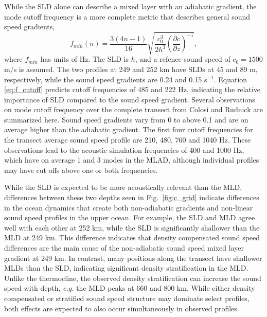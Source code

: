 \documentclass[preprint,NumberedRefs]{JASA}
\begin{document}
While the SLD alone can describe a mixed layer with an adiabatic gradient, the mode cutoff frequency\citep{Urick1982Prop} is a more complete metric that describes general sound speed gradients,
\begin{equation}
    f_{min}(n) = \frac{3(4n-1)}{16} \sqrt{\frac{c_0^3}{2h^3} \left( \frac{\partial c}{\partial z} \right) ^ {-1}},
    \label{eq:f_cutoff}
\end{equation}
where $f_{min}$ has units of Hz. The SLD is $h$, and a refence sound speed of $c_0 = 1500$ m/s is assumed. The two profiles at 249 and 252 km have SLDs at 45 and 89 m, respectively, while the sound speed gradients are 0.24 and 0.15 s$^{-1}$. Equation \eqref{eq:f_cutoff} predicts cutoff frequencies of 485 and 222 Hz, indicating the relative importance of SLD compared to the sound speed gradient. Several observations on mode cutoff frequency over the complete transect from Colosi and Rudnick\cite{colosi2020observations} are summarized here. Sound speed gradients vary from 0 to above 0.1 and are on average higher than the adiabatic gradient. The first four cutoff frequencies for the transect average sound speed profile are 210, 480, 760 and 1040 Hz. These observations lead to the acoustic simulation frequencies of 400 and 1000 Hz, which have on average 1 and 3 modes in the MLAD, although individual profiles may have cut offs above one or both frequencies.

While the SLD is expected to be more acoustically relevant than the MLD, differences between these two depths seen in Fig.~\ref{fig:c_grid} indicate differences in the ocean dynamics that create both non-adiabatic gradients and non-linear sound speed profiles in the upper ocean. For example, the SLD and MLD agree well with each other at 252 km, while the SLD is significantly shallower than the MLD at 249 km. This difference indicates that density compensated sound speed differences are the main cause of the non-adiabatic sound speed mixed layer gradient at 249 km. In contrast, many positions along the transect have shallower MLDs than the SLD, indicating significant density stratification in the MLD. Unlike the thermocline, the observed density stratification can increase the sound speed with depth, \emph{e.g.} the MLD peaks at 660 and 800 km. While either density compensated or stratified sound speed structure may dominate select profiles, both effects are expected to also occur simultaneously in observed profiles.
\end{document}

